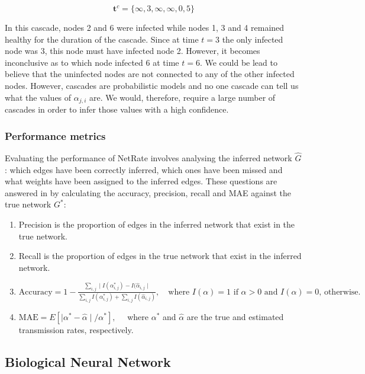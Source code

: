 \documentclass[11pt]{article}
\begin{document}
\begin{equation}\label{eq:cascade_example}
\textbf{t}^{c}=\{\infty, 3, \infty, \infty, 0, 5\}
\end{equation}

In this cascade, nodes 2 and 6 were infected while nodes 1, 3 and 4 remained healthy for the duration of the cascade. Since at time $t=3$ the only infected node was 3, this node must have infected node 2. However, it becomes inconclusive as to which node infected 6 at time $t=6$. We could be lead to believe that the uninfected nodes are not connected to any of the other infected nodes. However, cascades are probabilistic models and no one cascade can tell us what the values of $\alpha_{j,i}$ are. We would, therefore, require a large number of cascades in order to infer those values with a high confidence. 


\subsubsection{Performance metrics}

Evaluating the performance of NetRate involves analysing the inferred network $\hat G$: which edges have been correctly inferred, which ones have been missed and what weights have been assigned to the inferred edges. These questions are answered in \cite{rodriguez2011uncovering} by calculating the accuracy, precision, recall and MAE against the true network $G^{*}$:

\begin{enumerate}
\item Precision is the proportion of edges in the inferred network that exist in the true network.
\item Recall is the proportion of edges in the true network that exist in the inferred network.
\item $\text{Accuracy}=1-\frac{\sum_{i,j}\mid I(\alpha_{i,j}^{*})-I(\hat \alpha_{i,j}\mid}{\sum_{i,j}I(\alpha^{*}_{i,j})+\sum_{i,j}I(\hat \alpha _{i,j})}, \quad \text{where } I(\alpha)=1\text{ if } \alpha > 0\text{ and } I(\alpha)=0\text{, otherwise.}$
\item $\text{MAE} = E[\mid \alpha^{*} - \hat \alpha \mid /\alpha^{*}], \quad $ where $ \alpha^{*}$ and $\hat \alpha $ are the true and estimated transmission rates, respectively.
\end{enumerate}

\subsection{Biological Neural Network}
\end{document}
